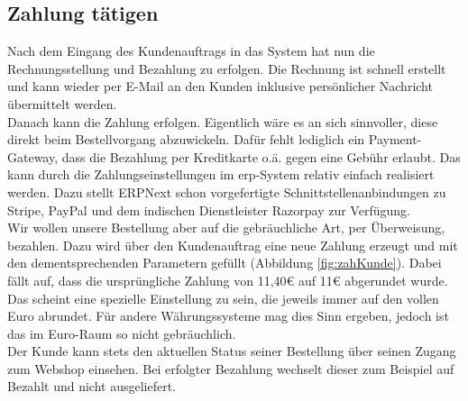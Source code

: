 \subsection{Zahlung tätigen}
Nach dem Eingang des Kundenauftrags in das System hat nun die Rechnungsstellung und Bezahlung zu erfolgen. Die Rechnung ist schnell erstellt und kann wieder per E-Mail an den Kunden inklusive persönlicher Nachricht übermittelt werden. \\
Danach kann die Zahlung erfolgen. Eigentlich wäre es an sich sinnvoller, diese direkt beim Bestellvorgang abzuwickeln. Dafür fehlt lediglich ein Payment-Gateway, dass die Bezahlung per Kreditkarte o.ä. gegen eine Gebühr erlaubt. Das kann durch die Zahlungseinstellungen im \gls{erp}-System relativ einfach realisiert werden. Dazu stellt ERPNext schon vorgefertigte Schnittstellenanbindungen zu Stripe, PayPal und dem indischen Dienstleister Razorpay zur Verfügung. \\
Wir wollen unsere Bestellung aber auf die gebräuchliche Art, per Überweisung, bezahlen. Dazu wird über den Kundenauftrag eine neue Zahlung erzeugt und mit den dementsprechenden Parametern gefüllt (\vgl Abbildung \ref{fig:zahKunde}). Dabei fällt auf, dass die ursprüngliche Zahlung von 11,40€ auf 11€ abgerundet wurde. Das scheint eine spezielle Einstellung zu sein, die jeweils immer auf den vollen Euro abrundet. Für andere Währungssysteme mag dies Sinn ergeben, jedoch ist das im Euro-Raum so nicht gebräuchlich. \\
Der Kunde kann stets den aktuellen Status seiner Bestellung über seinen Zugang zum Webshop einsehen. Bei erfolgter Bezahlung wechselt dieser zum Beispiel auf \glqq Bezahlt und nicht ausgeliefert\grqq. 

